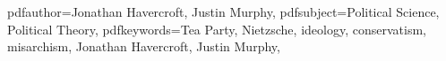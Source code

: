             pdfauthor={Jonathan Havercroft, Justin Murphy},
            pdfsubject={Political Science, Political Theory},
            pdfkeywords={Tea Party, Nietzsche, ideology, conservatism, misarchism, Jonathan Havercroft, Justin Murphy},
